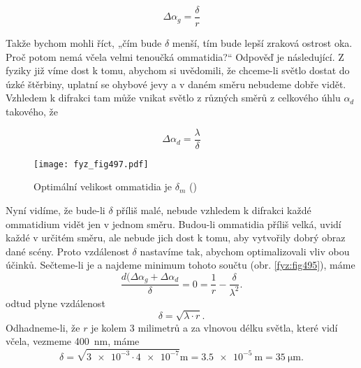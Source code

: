     \begin{equation}\label{fyz:eq682}
      \Delta\alpha_g = \frac{\delta}{r}
    \end{equation}

    Takže bychom mohli říct, „čím bude \(\delta\) menší, tím bude lepší zraková ostrost oka. Proč
    potom nemá včela velmi tenoučká ommatidia?“ Odpověď je následující. Z fyziky již víme dost k
    tomu, abychom si uvědomili, že chceme-li světlo dostat do úzké štěrbiny, uplatní se ohybové jevy
    a v daném směru nebudeme dobře vidět. Vzhledem k difrakci tam může vnikat světlo z různých směrů
    z celkového úhlu \(\alpha_d\) takového, že
    
    \begin{equation}\label{fyz:eq587}
      \Delta\alpha_d = \frac{\lambda}{\delta}
    \end{equation}    

    \begin{figure}[ht!] %
      \centering
      \texttt{[image: fyz\_fig497.pdf]}
      \caption{Optimální velikost ommatidia je \(\delta_m\) (\cite[s.~697]{Feynman01})}
      \label{fyz:fig497}
    \end{figure}

    Nyní vidíme, že bude-li \(\delta\) příliš malé, nebude vzhledem k difrakci každé ommatidium
    vidět jen v jednom směru. Budou-li ommatidia příliš velká, uvidí každé v určitém směru, ale
    nebude jich dost k tomu, aby vytvořily dobrý obraz dané scény. Proto vzdálenost \(\delta\)
    nastavíme tak, abychom optimalizovali vliv obou účinků. Sečteme-li je a najdeme minimum tohoto
    součtu (obr. \ref{fyz:fig495}), máme
    \begin{equation}\label{fyz:eq588}
      \frac{d(\Delta\alpha_g + \Delta\alpha_d}{\delta} = 0 = \frac{1}{r} - \frac{\delta}{\lambda^2}.
    \end{equation}     
    odtud plyne vzdálenost
    \begin{equation}\label{fyz:eq589}
      \delta = \sqrt{\lambda\cdot r}.
    \end{equation} 
    Odhadneme-li, že \(r\) je kolem 3 milimetrů a za vlnovou délku světla, které vidí včela, vezmeme
    \SI{400}{\nm}, máme
    \begin{equation}\label{fyz:eq590}
      \delta = \sqrt{\num{3e-3}\cdot\num{4e-7}}\si{\m} = \SI{3.5e-5}{\m} = \SI{35}{\micro\m}.
    \end{equation} 

